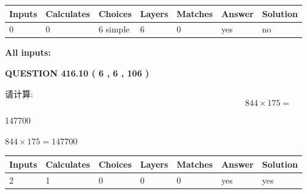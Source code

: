 \documentclass{ctexart}
\begin{document}
 
   
   
   
   
\noindent\begin{tabular}{|l|l|l|l|l|l|l|}
 \hline
Inputs & Calculates & Choices & Layers & Matches & Answer & Solution \\ \hline
 0  & 
 0  & 
 6
  simple  
  & 
 6  & 
 0  & 
  yes & 
  no 
  \\ \hline
 \end{tabular}
   
   
   
   
\noindent{}
   
   
   
   
\noindent\vspace{0.1in}\hspace{-0.08in} {\textbf{\Large{All inputs: }}}
   
   
  
\vspace{0.2in}
  
{\textbf{\Large{QUESTION
416.10 
 ( 6 , 6 , 106 )
}}}
  
  
 
请计算:
\begin{equation}
844  \times    %
175 = \nonumber
\end{equation}
 
 
 
\noindent{}
 
 

147700
 
 
\noindent{}
 
 

 
 
 
\noindent{}
 
 

$ %
844 \times  %
175=   %
147700$
 
 
\noindent{}
 
 

 
   
   
   
   
\noindent\begin{tabular}{|l|l|l|l|l|l|l|}
 \hline
Inputs & Calculates & Choices & Layers & Matches & Answer & Solution \\ \hline
 2  & 
 1  & 
 0
  & 
 0  & 
 0  & 
  yes & 
  yes 
  \\ \hline
 \end{tabular}
   
\end{document}
